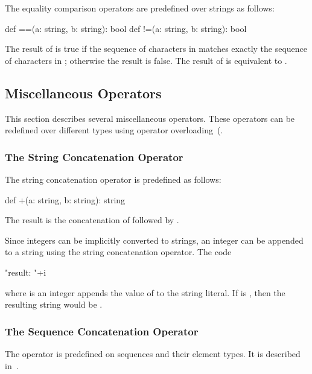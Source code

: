 The equality comparison operators are predefined over strings as
follows:
\begin{chapel}
def ==(a: string, b: string): bool
def !=(a: string, b: string): bool
\end{chapel}
The result of  is true if the sequence of characters
in  matches exactly the sequence of characters in ;
otherwise the result is false.  The result of  is
equivalent to .

\subsection{Miscellaneous Operators}
\label{Miscellaneous_Operators}

This section describes several miscellaneous operators.  These
operators can be redefined over different types using operator
overloading~(.

\subsubsection{The String Concatenation Operator}
\label{The_String_Concatenation_Operator}

The string concatenation operator is predefined as follows:
\begin{chapel}
def +(a: string, b: string): string
\end{chapel}
The result is the concatenation of  followed by .
\begin{example}
Since integers can be implicitly converted to strings, an integer can
be appended to a string using the string concatenation operator.  The
code
\begin{chapel}
"result: "+i
\end{chapel}
where  is an integer appends the value of  to the
string literal.  If  is , then the resulting string
would be .
\end{example}

\subsubsection{The Sequence Concatenation Operator}
\label{The_Sequence_Concatenation_Operator}

The operator \chpl{#} is predefined on sequences and their element
types.  It is described in~.

